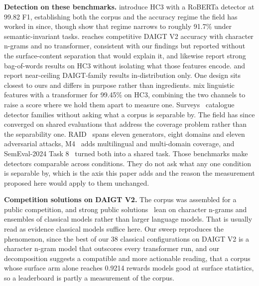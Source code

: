 \documentclass[conference,a4paper]{IEEEtran}
\begin{document}
\textbf{Detection on these benchmarks.} \citet{Guo2023close} introduce HC3 with a RoBERTa detector at 99.82 F1, establishing both the corpus and the accuracy regime the field has worked in since, though \citet{Su2023plus} show that regime narrows to roughly 91.7\% under semantic-invariant tasks. \citet{Zhou2024exploiting} reaches competitive DAIGT V2 accuracy with character n-grams and no transformer, consistent with our findings but reported without the surface-content separation that would explain it, and \citet{Kubrusly2025detecting} likewise report strong bag-of-words results on HC3 without isolating what those features encode. \citet{Ansary2026multirepresentation} and \citet{Lamsiyah2025daigt} report near-ceiling DAIGT-family results in-distribution only. One design sits closest to ours and differs in purpose rather than ingredients. \citet{Annepaka2026synergizing} mix linguistic features with a transformer for 99.45\% on HC3, combining the two channels to raise a score where we hold them apart to measure one. Surveys~\cite{Crothers2023machine} catalogue detector families without asking what a corpus is separable by. The field has since converged on shared evaluations that address the coverage problem rather than the separability one. RAID~\cite{Dugan2024raid} spans eleven generators, eight domains and eleven adversarial attacks, M4~\cite{Wang2024m4} adds multilingual and multi-domain coverage, and SemEval-2024 Task 8~\cite{Wang2024semeval} turned both into a shared task. Those benchmarks make detectors comparable across conditions. They do not ask what any one condition is separable by, which is the axis this paper adds and the reason the measurement proposed here would apply to them unchanged.

\textbf{Competition solutions on DAIGT V2.} The corpus was assembled for a public competition, and strong public solutions~\cite{Zain2025multi} lean on character n-grams and ensembles of classical models rather than larger language models. That is usually read as evidence classical models suffice here. Our sweep reproduces the phenomenon, since the best of our 38 classical configurations on DAIGT V2 is a character n-gram model that outscores every transformer run, and our decomposition suggests a compatible and more actionable reading, that a corpus whose surface arm alone reaches 0.9214 rewards models good at surface statistics, so a leaderboard is partly a measurement of the corpus.
\end{document}
